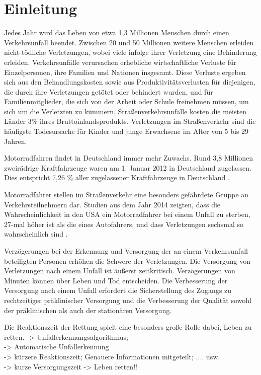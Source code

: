 \chapter{Einleitung}
%
%
%
%
%
%
Jedes Jahr wird das Leben von etwa 1,3 Millionen Menschen durch einen Verkehrsunfall beendet. Zwischen 20 und 50 Millionen weitere Menschen erleiden nicht-tödliche Verletzungen, wobei viele infolge ihrer Verletzung eine Behinderung erleiden. Verkehrsunfälle verursachen erhebliche wirtschaftliche Verluste für Einzelpersonen, ihre Familien und Nationen insgesamt. Diese Verluste ergeben sich aus den Behandlungskosten sowie aus Produktivitätsverlusten für diejenigen, die durch ihre Verletzungen getötet oder behindert wurden, und für Familienmitglieder, die sich von der Arbeit oder Schule freinehmen müssen, um sich um die Verletzten zu kümmern. Straßenverkehrsunfälle kosten die meisten Länder 3\% ihres Bruttoinlandsprodukts. Verletzungen im Straßenverkehr sind die häufigste Todesursache für Kinder und junge Erwachsene im Alter von 5 bis 29 Jahren.\citep{healthorganization2022}

Motorradfahren findet in Deutschland immer mehr Zuwachs.  Rund 3,8 Millionen zweirädrige Kraftfahrzeuge waren am 1. Januar 2012 in Deutschland zugelassen. Dies entspricht 7,26 \% aller zugelassener Kraftfahrzeuge in Deutschland \citep{Haedrich2012}.

Motorradfahrer stellen im Straßenverkehr eine besonders gefährdete Gruppe an Verkehrsteilnehmern dar. Studien aus dem Jahr 2014 zeigten, dass die Wahrscheinlichkeit in den USA ein Motorradfahrer bei einem Unfall zu sterben, 27-mal höher ist als die eines Autofahrers, und dass Verletzungen sechsmal so wahrscheinlich sind \citep{NHTSA}.

Verzögerungen bei der Erkennung und Versorgung der an einem Verkehrsunfall beteiligten Personen erhöhen die Schwere der Verletzungen. Die Versorgung von Verletzungen nach einem Unfall ist äußerst zeitkritisch. Verzögerungen von Minuten können über Leben und Tod entscheiden. Die Verbesserung der Versorgung nach einem Unfall erfordert die Sicherstellung des Zugangs zu rechtzeitiger präklinischer Versorgung und die Verbesserung der Qualität sowohl der präklinischen als auch der stationären Versorgung.\citep{healthorganization2022}

Die Reaktionszeit der Rettung spielt eine besonders große Rolle dabei, Leben zu retten.
-> Unfallerkennungsalgorithmus; \\
-> Automatische Unfallerkennung \\
-> kürzere Reaktionszeit; Genauere Informationen mitgeteilt; .... usw.\\
-> kurze Versorgungszeit -> Leben retten!!\\


